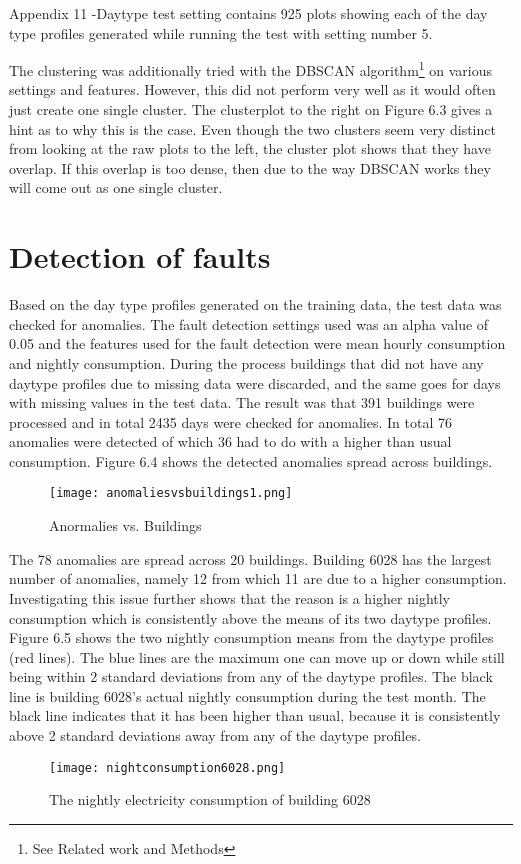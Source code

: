 Appendix 11 -Daytype test setting contains 925 plots showing each of the day type profiles generated while running the test with setting number 5.

The clustering was additionally tried with the DBSCAN algorithm\footnote{See Related work and Methods} on various settings and features. However, this did not perform very well as it would often just create one single cluster. The clusterplot to the right on Figure 6.3 gives a hint as to why this is the case. Even though the two clusters seem very distinct from looking at the raw plots to the left, the cluster plot shows that they have overlap. If this overlap is too dense, then due to the way DBSCAN works they will come out as one single cluster.

\section*{Detection of faults}
Based on the day type profiles generated on the training data, the test data was checked for anomalies. The fault detection settings used was an alpha value of 0.05 and the features used for the fault detection were mean hourly consumption and nightly consumption. During the process buildings that did not have any daytype profiles due to missing data were discarded, and the same goes for days with missing values in the test data. The result was that 391 buildings were processed and in total 2435 days were checked for anomalies. In total 76 anomalies were detected of which 36 had to do with a higher than usual consumption. Figure 6.4 shows the detected anomalies spread across buildings.
\begin{figure}
\begin{center}
\texttt{[image: anomaliesvsbuildings1.png]}
\end{center}
\caption{Anormalies vs. Buildings}
\end{figure}

The 78 anomalies are spread across 20 buildings. Building 6028 has the largest number of anomalies, namely 12 from which 11 are due to a higher consumption. Investigating this issue further shows that the reason is a higher nightly consumption which is consistently above the means of its two daytype profiles. Figure 6.5 shows the two nightly consumption means from the daytype profiles (red lines). The blue lines are the maximum one can move up or down while still being within 2 standard deviations from any of the daytype profiles. The black line is building 6028's actual nightly consumption during the test month. The black line indicates that it has been higher than usual, because it is consistently above 2 standard deviations away from any of the daytype profiles.
\begin{figure}
\begin{center}
\texttt{[image: nightconsumption6028.png]}
\end{center}
\caption{The nightly electricity consumption of building 6028}
\end{figure}

